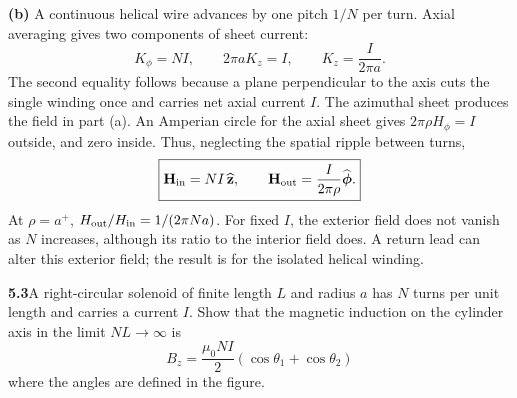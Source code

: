 \textbf{(b)} A continuous helical wire advances by one pitch $1/N$ per
turn. Axial averaging gives two components of sheet current:
\[
K_\phi=NI,\qquad 2\pi aK_z=I,\qquad K_z=\frac{I}{2\pi a}.
\]
The second equality follows because a plane perpendicular to the axis
cuts the single winding once and carries net axial current $I$.
The azimuthal sheet produces the field in part (a). An Amperian circle
for the axial sheet gives $2\pi\rho H_\phi=I$ outside, and zero inside.
Thus, neglecting the spatial ripple between turns,
\[
\boxed{\mathbf H_{\rm in}=NI\,\widehat{\mathbf z},\qquad
\mathbf H_{\rm out}=\frac{I}{2\pi\rho}\widehat{\boldsymbol\phi}.}
\]
At $\rho=a^+$, $H_{\rm out}/H_{\rm in}=1/(2\pi Na)$.
For fixed $I$, the exterior field does not vanish as $N$ increases,
although its ratio to the interior field does. A return lead can alter
this exterior field; the result is for the isolated helical winding.


\par\bigskip
\noindent\textbf{5.3}\quad A right-circular solenoid of finite length $L$ and radius $a$ has $N$ turns per unit length and carries a current $I$. Show that the magnetic induction on the cylinder axis in the limit $NL\to\infty$ is
\[
B_{z}=\frac{\mu_{0}NI}{2}\left(\cos\theta_{1}+\cos\theta_{2}\right)
\]
where the angles are defined in the figure.

